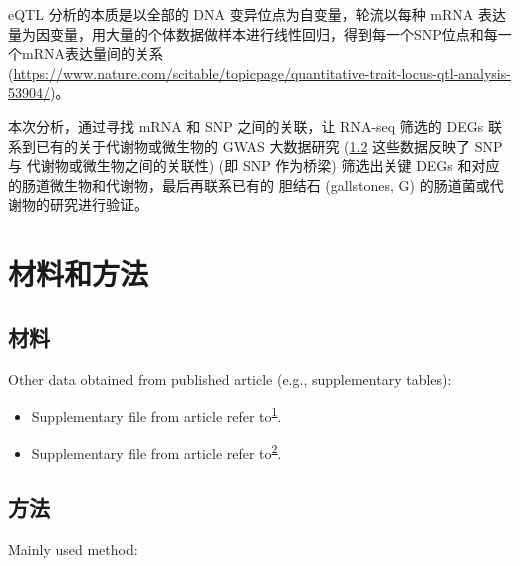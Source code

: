 \documentclass[
]{article}
\providecommand{\tightlist}{%
  \setlength{\itemsep}{0pt}\setlength{\parskip}{0pt}}
\begin{document}
eQTL 分析的本质是以全部的 DNA 变异位点为自变量，轮流以每种 mRNA 表达量为因变量，用大量的个体数据做样本进行线性回归，得到每一个SNP位点和每一个mRNA表达量间的关系 (\url{https://www.nature.com/scitable/topicpage/quantitative-trait-locus-qtl-analysis-53904/})。

本次分析，通过寻找 mRNA 和 SNP 之间的关联，让 RNA-seq 筛选的 DEGs 联系到已有的关于代谢物或微生物的 GWAS 大数据研究 (\ref{method} 这些数据反映了 SNP 与 代谢物或微生物之间的关联性) (即 SNP 作为桥梁) 筛选出关键 DEGs 和对应的肠道微生物和代谢物，最后再联系已有的 胆结石 (gallstones, G) 的肠道菌或代谢物的研究进行验证。

\hypertarget{methods}{%
\section{材料和方法}\label{methods}}

\hypertarget{material}{%
\subsection{材料}\label{material}}

Other data obtained from published article (e.g., supplementary tables):

\begin{itemize}
\tightlist
\item
  Supplementary file from article refer to\textsuperscript{\protect\hyperlink{ref-ChangesAndCorChen2021}{1}}.
\item
  Supplementary file from article refer to\textsuperscript{\protect\hyperlink{ref-MendelianRandoLiuX2022}{2}}.
\end{itemize}

\hypertarget{method}{%
\subsection{方法}\label{method}}

Mainly used method:
\end{document}
